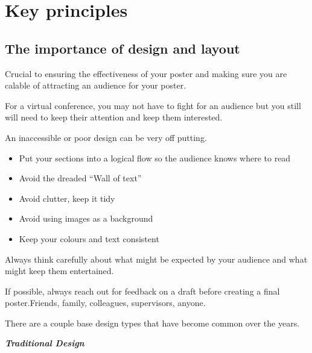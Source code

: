 \documentclass[
]{book}
\providecommand{\tightlist}{%
  \setlength{\itemsep}{0pt}\setlength{\parskip}{0pt}}
\begin{document}
\hypertarget{key-principles}{%
\section{Key principles}\label{key-principles}}

\hypertarget{the-importance-of-design-and-layout}{%
\subsection{The importance of design and layout}\label{the-importance-of-design-and-layout}}

Crucial to ensuring the effectiveness of your poster and making sure you are calable of attracting an audience for your poster.

For a virtual conference, you may not have to fight for an audience but you still will need to keep their attention and keep them interested.

An inaccessible or poor design can be very off putting.

\begin{itemize}
\tightlist
\item
  Put your sections into a logical flow so the audience knows where to read
\item
  Avoid the dreaded ``Wall of text''
\item
  Avoid clutter, keep it tidy
\item
  Avoid using images as a background
\item
  Keep your colours and text consistent
\end{itemize}

Always think carefully about what might be expected by your audience and what might keep them entertained.

If possible, always reach out for feedback on a draft before creating a final poster.Friends, family, colleagues, supervisors, anyone.

There are a couple base design types that have become common over the years.

\textbf{\emph{Traditional Design}}
\end{document}
